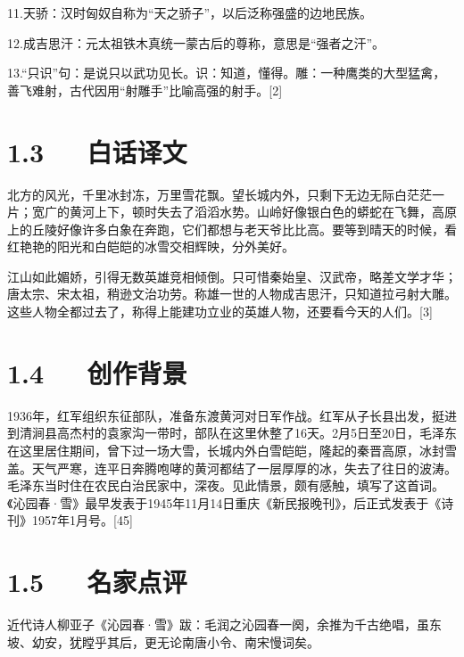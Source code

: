 \documentclass[letterpaper,12pt,english]{sphinxmanual}
\begin{document}
11.天骄：汉时匈奴自称为“天之骄子”，以后泛称强盛的边地民族。

12.成吉思汗：元太祖铁木真统一蒙古后的尊称，意思是“强者之汗”。

13.“只识”句：是说只以武功见长。识：知道，懂得。雕：一种鹰类的大型猛禽，善飞难射，古代因用“射雕手”比喻高强的射手。{[}2{]}


\section{1.3   白话译文}
\label{\detokenize{p01_u6563_u6587/_u6bdb_u6cfd_u4e1c-_u6c81_u56ed_u6625_xb7_u96ea:id5}}
北方的风光，千里冰封冻，万里雪花飘。望长城内外，只剩下无边无际白茫茫一片；宽广的黄河上下，顿时失去了滔滔水势。山岭好像银白色的蟒蛇在飞舞，高原上的丘陵好像许多白象在奔跑，它们都想与老天爷比比高。要等到晴天的时候，看红艳艳的阳光和白皑皑的冰雪交相辉映，分外美好。

江山如此媚娇，引得无数英雄竞相倾倒。只可惜秦始皇、汉武帝，略差文学才华；唐太宗、宋太祖，稍逊文治功劳。称雄一世的人物成吉思汗，只知道拉弓射大雕。这些人物全都过去了，称得上能建功立业的英雄人物，还要看今天的人们。{[}3{]}


\section{1.4   创作背景}
\label{\detokenize{p01_u6563_u6587/_u6bdb_u6cfd_u4e1c-_u6c81_u56ed_u6625_xb7_u96ea:id6}}
1936年，红军组织东征部队，准备东渡黄河对日军作战。红军从子长县出发，挺进到清涧县高杰村的袁家沟一带时，部队在这里休整了16天。2月5日至20日，毛泽东在这里居住期间，曾下过一场大雪，长城内外白雪皑皑，隆起的秦晋高原，冰封雪盖。天气严寒，连平日奔腾咆哮的黄河都结了一层厚厚的冰，失去了往日的波涛。毛泽东当时住在农民白治民家中，深夜。见此情景，颇有感触，填写了这首词。《沁园春·雪》最早发表于1945年11月14日重庆《新民报晚刊》，后正式发表于《诗刊》1957年1月号。{[}4\sphinxhyphen{}5{]}


\section{1.5   名家点评}
\label{\detokenize{p01_u6563_u6587/_u6bdb_u6cfd_u4e1c-_u6c81_u56ed_u6625_xb7_u96ea:id7}}
近代诗人柳亚子《沁园春·雪》跋：毛润之沁园春一阕，余推为千古绝唱，虽东坡、幼安，犹瞠乎其后，更无论南唐小令、南宋慢词矣。
\end{document}
